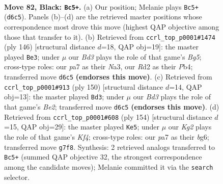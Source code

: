 \documentclass[11pt]{article}
\begin{document}
\clearpage

\begin{figure}[p]\centering
\begin{subfigure}{0.46\textwidth}\centering
\resizebox{\linewidth}{!}{%
\newchessgame
\chessboard[
  setfen={8/P5k1/3bR3/5p2/b4P2/8/3r4/6K1 b - - 0 82},
  showmover=false,
  pgfstyle=straightmove, color=movearrow, markmove={d6-c5}
]}
\caption{}
\end{subfigure}\hfill
\begin{subfigure}{0.46\textwidth}\centering
\resizebox{\linewidth}{!}{%
\newchessgame
\chessboard[
  setfen={4k3/6p1/8/1p2P1Br/1P6/N7/1K6/8 w - - 5 74},
  showmover=false,
  pgfstyle=straightmove, color=movearrow, markmove={g5-e3}
]}
\caption{}
\end{subfigure}
\\[4pt]
\begin{subfigure}{0.46\textwidth}\centering
\resizebox{\linewidth}{!}{%
\newchessgame
\chessboard[
  setfen={8/5k2/5p1p/7P/4r3/6K1/3RB3/8 w - - 13 76},
  showmover=false,
  pgfstyle=straightmove, color=movearrow, markmove={e2-d3}
]}
\caption{}
\end{subfigure}\hfill
\begin{subfigure}{0.46\textwidth}\centering
\resizebox{\linewidth}{!}{%
\newchessgame
\chessboard[
  setfen={8/8/p5bk/8/r1BB1K2/8/8/2R5 w - - 9 78},
  showmover=false,
  pgfstyle=straightmove, color=movearrow, markmove={f4-e5}
]}
\caption{}
\end{subfigure}
\caption{\textbf{Move 82, Black: \texttt{Bc5+}.} (a) Our position; Melanie plays \texttt{Bc5+} (\texttt{d6c5}). Panels (b)--(d) are the retrieved master positions whose correspondence most drove this move (highest QAP objective among those that transfer to it). (b) Retrieved from \texttt{ccrl\_top\_p0001\#1474} (ply 146) [structural distance $d$=18, QAP obj=19]: the master played \texttt{Be3}; under $\mu$ our \emph{Bd3} plays the role of that game's \emph{Bg5}; cross-type roles: our \emph{p}a7 as their \emph{N}a3, our \emph{R}d2 as their \emph{P}b4; transferred move \texttt{d6c5} \textbf{(endorses this move)}. (c) Retrieved from \texttt{ccrl\_top\_p0001\#913} (ply 150) [structural distance $d$=14, QAP obj=13]: the master played \texttt{Bd3}; under $\mu$ our \emph{Bd3} plays the role of that game's \emph{Be2}; transferred move \texttt{d6c5} \textbf{(endorses this move)}. (d) Retrieved from \texttt{ccrl\_top\_p0001\#608} (ply 154) [structural distance $d$=15, QAP obj=29]: the master played \texttt{Ke5}; under $\mu$ our \emph{Kg2} plays the role of that game's \emph{Kf4}; cross-type roles: our \emph{p}a7 as their \emph{b}g6; transferred move \texttt{g7f8}. Synthesis: 2 retrieved analogs transferred to \texttt{Bc5+} (summed QAP objective 32, the strongest correspondence among the candidate moves); Melanie committed it via the \texttt{search} selector.}
\label{fig:thought-m163}
\end{figure}
\end{document}
